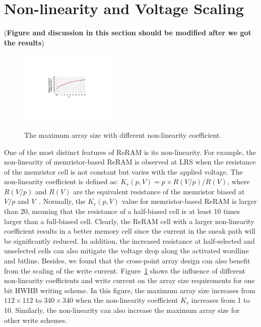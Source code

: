 \section{Non-linearity and Voltage Scaling}\label{sec:scale}
(\textbf{Figure and discussion in this section should be modified after we
got the results})
\begin{figure}[!b]
\centering
  \includegraphics[width=0.4\textwidth]{./figures/non_linear_f}\\
  \caption{The maximum array size with different non-linearity coefficient.}\label{fig:non_linear}
\end{figure}
One of the most distinct features of ReRAM is its non-linearity. For
example, the non-linearity of memristor-based ReRAM is observed at LRS
when the resistance of the memristor cell is not constant but varies with
the applied voltage. The non-linearity coefficient is defined as:
$K_r(p,V) = p \times R(V/p)/R(V)$, where $R(V/p)$ and $R(V)$ are the
equivalent resistance of the memristor biased at $V/p$ and
$V$~\cite{memristor:Cong}. Normally, the $K_r(p,V)$ value for
memristor-based ReRAM is larger than 20, meaning that the resistance of a
half-biased  cell is at least 10 times larger than a full-biased cell.
Clearly, the ReRAM cell with a larger non-linearity coefficient results in
a better memory cell since the current in the sneak path will be
significantly reduced. In addition, the increased resistance at
half-selected and unselected cells can also mitigate the voltage drop
along the activated wordline and bitline. Besides, we found that the
cross-point array design can also benefit from the scaling of the write
current. Figure~\ref{fig:non_linear} shows the influence of different
non-linearity coefficients and write current on the array size
requirements for one bit HWHB writing scheme. In this figure, the maximum
array size increases from $112 \times 112$ to $340 \times 340$ when the
non-linearity coefficient $K_r$ increases from 1 to 10. Similarly, the
non-linearity can also increase the maximum array size for other write
schemes.

